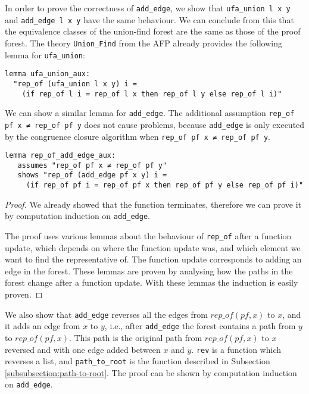 In order to prove the correctness of \lstinline|add_edge|, we show that \lstinline{ufa_union l x y} and \lstinline{add_edge l x y} have the same behaviour.
We can conclude from this that the equivalence classes of the union-find forest are the same as those of the proof forest.
The theory \lstinline{Union_Find} from the AFP \cite{Sep} already provides the following lemma for \lstinline{ufa_union}:

\begin{lstlisting}
lemma ufa_union_aux:
  "rep_of (ufa_union l x y) i =
    (if rep_of l i = rep_of l x then rep_of l y else rep_of l i)"
\end{lstlisting}

We can show a similar lemma for \lstinline{add_edge}.
The additional assumption \lstinline{rep_of pf x ≠ rep_of pf y} does not cause problems, because \lstinline{add_edge} is only executed by the congruence closure algorithm when \lstinline{rep_of pf x ≠ rep_of pf y}.

\begin{lstlisting}
lemma rep_of_add_edge_aux:
   assumes "rep_of pf x ≠ rep_of pf y"
   shows "rep_of (add_edge pf x y) i =
     (if rep_of pf i = rep_of pf x then rep_of pf y else rep_of pf i)"
\end{lstlisting}

\begin{proof}
We already showed that the function terminates, therefore we can prove it by computation induction on \lstinline{add_edge}.

The proof uses various lemmas about the behaviour of \lstinline{rep_of} after a function update, which depends on where the function update was, and which element we want to find the representative of.
The function update corresponds to adding an edge in the forest.
These lemmas are proven by analysing how the paths in the forest change after a function update.
With these lemmas the induction is easily proven.
\end{proof}

We also show that \lstinline|add_edge| reverses all the edges from $rep\_of(pf,x)$ to $x$, and it adds an edge from $x$ to $y$, i.e., after \lstinline|add_edge| the forest contains a path from $y$ to $rep\_of(pf,x)$. This path is the original path from $rep\_of(pf,x)$ to $x$ reversed and with one edge added between $x$ and $y$. \lstinline|rev| is a function which reverses a list, and \lstinline|path_to_root| is the function described in Subsection \ref{subsubsection:path-to-root}. The proof can be shown by computation induction on \lstinline|add_edge|.

